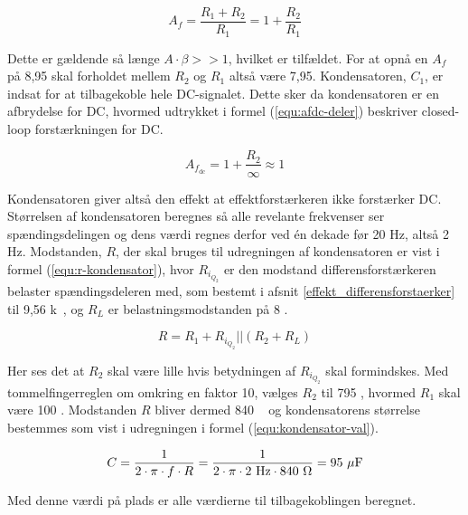 \begin{equation}
\label{equ:af-deler}
A_f = \frac{R_1 + R_2}{R_1} = 1 + \frac{R_2}{R_1}
\end{equation}

Dette er gældende så længe $A \cdot \beta >> 1$, hvilket er tilfældet. For at opnå en $A_f$ på 8,95 skal forholdet mellem $R_2$ og $R_1$ altså være 7,95. Kondensatoren, $C_1$, er indsat for at tilbagekoble hele DC-signalet. Dette sker da kondensatoren er en afbrydelse for DC, hvormed udtrykket i formel (\ref{equ:afdc-deler}) beskriver closed-loop forstærkningen for DC.

\begin{equation}
\label{equ:afdc-deler}
A_{f_\mathrm{dc}} = 1 + \frac{R_2}{\infty} \approx 1
\end{equation}

Kondensatoren giver altså den effekt at effektforstærkeren ikke forstærker DC. Størrelsen af kondensatoren beregnes så alle revelante frekvenser ser spændingsdelingen og dens værdi regnes derfor ved én dekade før 20 Hz, altså 2 Hz. Modstanden, $R$, der skal bruges til udregningen af kondensatoren er vist i formel (\ref{equ:r-kondensator}), hvor $R_{i_{Q_2}}$ er den modstand differensforstærkeren belaster spændingsdeleren med, som bestemt i afsnit \ref{effekt_differensforstaerker} til 9,56 k\ohm~, og $R_L$ er belastningsmodstanden på 8 \ohm.

\begin{equation}
\label{equ:r-kondensator}
R = R_1 + R_{i_{Q_2}}||(R_2 + R_L)
\end{equation}

Her ses det at $R_2$ skal være lille hvis betydningen af $R_{i_{Q_2}}$ skal formindskes. Med tommelfingerreglen om omkring en faktor 10, vælges $R_2$ til 795 \ohm, hvormed $R_1$ skal være 100 \ohm. Modstanden $R$ bliver dermed 840 \ohm~ og kondensatorens størrelse bestemmes som vist i udregningen i formel (\ref{equ:kondensator-val}).

\begin{equation}
\label{equ:kondensator-val}
C = \frac{1}{2 \cdot \pi \cdot f \cdot R} = \frac{1}{2 \cdot \pi \cdot \mathrm{2~Hz} \cdot \mathrm{840~\ohm}} = \mathrm{95~\mu F}
\end{equation}

Med denne værdi på plads er alle værdierne til tilbagekoblingen beregnet.